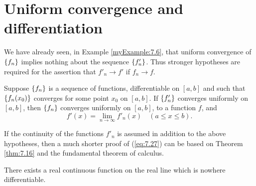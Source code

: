 \section{Uniform convergence and differentiation}

We have already seen, in Example \ref{myExample:7.6}, 
that uniform convergence of $\protect\{f_n\}$ implies
nothing about the sequence $\protect\{f'_n\}$. 
Thus stronger hypotheses are required for the assertion that 
$f'_n \rightarrow f'$ if $f_n \rightarrow f$.

\begin{thm}
    \label{thm:7.17}
    Suppose $\protect\{f_n\}$ is a sequence of functions, differentiable on $[a, b]$
    and such that $\protect\{f_n(x_0)\}$ converges for some point $x_0$ on $[a, b]$. 
    If $\protect\{f'_n\}$ converges uniformly on $[a, b ]$, 
    then $\protect\{f_n\}$ converges uniformly on $[a, b ]$, 
    to a function $f$, and
    \begin{equation}
        \label{eq:7.27}
        f'(x) = \lim_{n \to \infty} f'_n (x)
        \quad 
        (a \leq x \leq b).
    \end{equation}
\end{thm}


\begin{myRemark*}
    If the continuity of the functions $f'_n$ is assumed in addition to
    the above hypotheses, 
    then a much shorter proof of (\ref{eq:7.27}) can be based on
    Theorem \ref{thm:7.16} and the fundamental theorem of calculus.
\end{myRemark*}

\begin{thm}
    There exists a real continuous function on the real line which is
    nowhere differentiable.
\end{thm}

